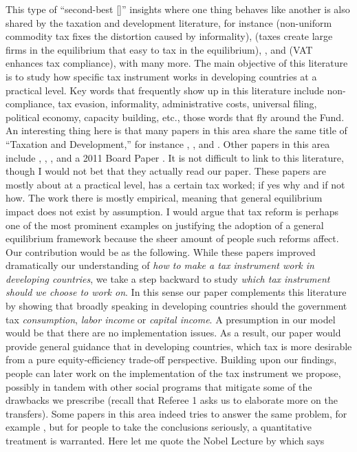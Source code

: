 \documentclass[twoside,11pt,leqno]{article}
\begin{document}
This type of ``second-best [\citet{LipseyLancaster:1956}]'' insights where one thing behaves like another is also shared by the taxation and development literature, for instance \citet{EmranStiglitz:2005} (non-uniform commodity tax fixes the distortion caused by informality), \citet{AuriolWarlters:2005} (taxes create large firms in the equilibrium that easy to tax in the equilibrium), \citet{Keen:2008}, \citet{GordonLi:2009} and \citet{Fanetal:2018} (VAT enhances tax compliance), with many more. The main objective of this literature is to study how specific tax instrument works in developing countries at a practical level. Key words that frequently show up in this literature include non-compliance, tax evasion, informality, administrative costs, universal filing, political economy, capacity building, etc., those words that fly around the Fund. An interesting thing here is that many papers in this area share the same title of ``Taxation and Development,'' for instance \citet{BurgessStern:1993}, \citet{Keen:2012}, and \citet{BesleyPersson:2013}. Other papers in this area include \citet{Keen:2008}, \citet{KeenLockwood:2010}, \citet{GordonLi:2009}, and a 2011 Board Paper \citet{IMF:2011}. It is not difficult to link to this literature, though I would not bet that they actually read our paper. These papers are mostly about at a practical level, has a certain tax worked; if yes why and if not how. The work there is mostly empirical, meaning that general equilibrium impact does not exist by assumption. I would argue that tax reform is perhaps one of the most prominent examples on justifying the adoption of a general equilibrium framework because the sheer amount of people such reforms affect. Our contribution would be as the following. While these papers improved dramatically our understanding of \textit{how to make a tax instrument work in developing countries}, we take a step backward to study \textit{which tax instrument should we choose to work on}. In this sense our paper complements this literature by showing that broadly speaking in developing countries should the government tax \textit{consumption}, \textit{labor income} or \textit{capital income}. A presumption in our model would be that there are no implementation issues. As a result, our paper would provide general guidance that in developing countries, which tax is more desirable from a pure equity-efficiency trade-off perspective. Building upon our findings, people can later work on the implementation of the tax instrument we propose, possibly in tandem with other social programs that mitigate some of the drawbacks we prescribe (recall that Referee 1 asks us to elaborate more on the transfers). Some papers in this area indeed tries to answer the same problem, for example \citet{EmranStiglitz:2005}, but for people to take the conclusions seriously, a quantitative treatment is warranted. Here let me quote the Nobel Lecture by \citet{Prescott:2006} which says
\end{document}
